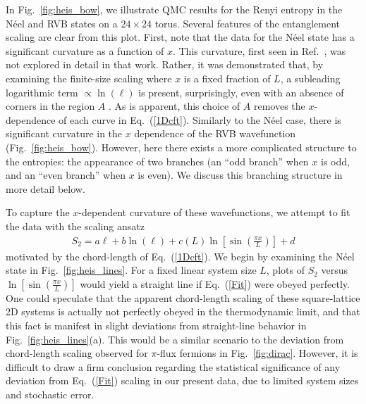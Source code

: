 \documentclass[prl,aps,twocolumn,floatfix,amsmath,amssymb,superscriptaddress,tightenlines]{revtex4}
\begin{document}
In Fig.~{\ref{fig:heis_bow}}, we illustrate QMC results for the Renyi entropy in the N\'eel and RVB states on a $24 \times 24$ torus.  
Several features of the entanglement scaling are clear from this plot.  First, note that the data for the N\'eel state has a significant curvature as a function of $x$.  This curvature, first seen in Ref.~\cite{HeisLog}, was not explored in detail in that work.  Rather, it was demonstrated that, by examining the finite-size scaling where $x$ is a fixed fraction of $L$, a subleading logarithmic term $\propto \ln(\ell)$ is present, surprisingly, even with an absence of corners in the region $A$ \cite{MaxLog}.
As is apparent, this choice of $A$ removes the $x$-dependence of each curve in Eq.~(\ref{1Dcft}).  
Similarly to the N\'eel case, there is significant curvature in the $x$ dependence of the RVB wavefunction (Fig.~\ref{fig:heis_bow}).  However, here there exists a more complicated structure to the entropies: the appearance of two branches (an ``odd branch'' when $x$ is odd, and an ``even branch'' when $x$ is even).  We discuss this branching structure in more detail below.

To capture the $x$-dependent curvature of these wavefunctions, we attempt to fit the data with the scaling ansatz
\begin{align}
S_2= a \ell + b\ln(\ell)
+ c(L) \ln \left[{ \sin\left({ \frac{\pi x}{L} }\right) }\right] + d \label{Fit}
\end{align}
motivated by the chord-length of Eq.~(\ref{1Dcft}).
We begin by examining the N\'eel state in Fig.~{\ref{fig:heis_lines}}.  For a fixed linear system size $L$, plots of $S_2$ versus $ \ln \left[{ \sin\left({ \frac{\pi x}{L} }\right) }\right] $ would yield a straight line if Eq.~(\ref{Fit}) were obeyed perfectly.  
One could speculate that the apparent chord-length scaling of these square-lattice 2D systems is actually not perfectly obeyed in the thermodynamic limit, and that this fact is manifest in slight deviations from straight-line behavior in Fig.~{\ref{fig:heis_lines}}(a).
This would be a similar scenario to the deviation from chord-length scaling observed for $\pi$-flux fermions in Fig.~\ref{fig:dirac}.  
However, it is difficult to draw a firm conclusion regarding the statistical significance of any deviation from Eq.~(\ref{Fit}) scaling in our
present data, due to limited system sizes and stochastic error.
\end{document}
